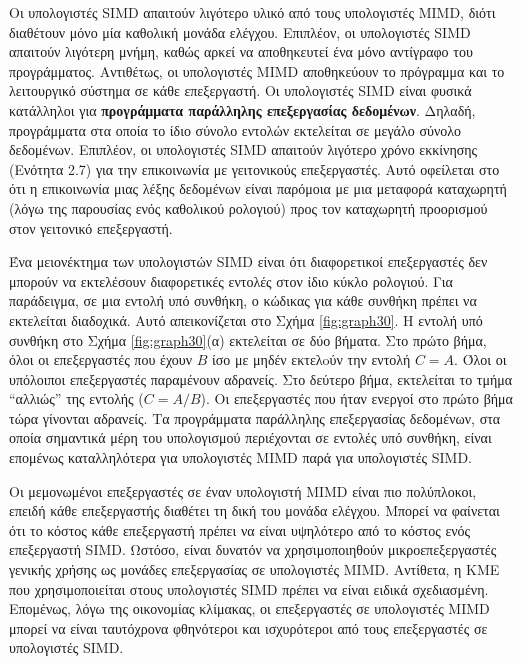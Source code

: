 \documentclass[12pt,a4paper]{article} %
\begin{document}
Οι υπολογιστές SIMD απαιτούν λιγότερο υλικό από τους υπολογιστές MIMD, διότι
διαθέτουν μόνο μία καθολική μονάδα ελέγχου. Επιπλέον, οι υπολογιστές SIMD απαιτούν
λιγότερη μνήμη, καθώς αρκεί να αποθηκευτεί ένα μόνο αντίγραφο του προγράμματος.
Αντιθέτως, οι υπολογιστές MIMD αποθηκεύουν το πρόγραμμα και το λειτουργικό σύστημα
σε κάθε επεξεργαστή. Οι υπολογιστές SIMD είναι φυσικά κατάλληλοι για
\textbf{προγράμματα παράλληλης επεξεργασίας δεδομένων}. Δηλαδή, προγράμματα
στα οποία το ίδιο σύνολο εντολών εκτελείται σε μεγάλο σύνολο δεδομένων. Επιπλέον,
οι υπολογιστές SIMD απαιτούν λιγότερο χρόνο εκκίνησης (Ενότητα 2.7) για την
επικοινωνία με γειτονικούς επεξεργαστές. Αυτό οφείλεται στο ότι η επικοινωνία μιας λέξης 
δεδομένων είναι παρόμοια με μια μεταφορά καταχωρητή (λόγω της παρουσίας 
ενός καθολικού ρολογιού) προς τον καταχωρητή προορισμού στον γειτονικό 
επεξεργαστή.

\begin{sloppypar}
Ένα μειονέκτημα των υπολογιστών SIMD είναι ότι διαφορετικοί επεξεργαστές 
δεν μπορούν να εκτελέσουν διαφορετικές εντολές στον ίδιο κύκλο ρολογιού. 
Για παράδειγμα, σε μια εντολή υπό συνθήκη, ο κώδικας για κάθε συνθήκη 
πρέπει να εκτελείται διαδοχικά. Αυτό απεικονίζεται στο Σχήμα \ref{fig:graph30}. Η 
εντολή υπό συνθήκη στο Σχήμα \ref{fig:graph30}(α) εκτελείται σε δύο βήματα. Στο πρώτο 
βήμα, όλοι οι επεξεργαστές που έχουν \( B \) ίσο με μηδέν εκτελoύν την 
εντολή \( C = A \). Όλοι οι υπόλοιποι επεξεργαστές παραμένουν αδρανείς. 
Στο δεύτερο βήμα, εκτελείται το τμήμα ``αλλιώς'' της εντολής (\( C = A/B \)). 
Οι επεξεργαστές που ήταν ενεργοί στο πρώτο βήμα τώρα γίνονται αδρανείς. 
Τα προγράμματα παράλληλης επεξεργασίας δεδομένων, στα οποία σημαντικά 
μέρη του υπολογισμού περιέχονται σε εντολές υπό συνθήκη, είναι επομένως 
καταλληλότερα για υπολογιστές MIMD παρά για υπολογιστές SIMD. 
\end{sloppypar}

Οι μεμονωμένοι επεξεργαστές σε έναν υπολογιστή MIMD είναι πιο πολύπλοκοι, 
επειδή κάθε επεξεργαστής διαθέτει τη δική του μονάδα ελέγχου. Μπορεί να 
φαίνεται ότι το κόστος κάθε επεξεργαστή πρέπει να είναι υψηλότερο από 
το κόστος ενός επεξεργαστή SIMD. Ωστόσο, είναι δυνατόν να χρησιμοποιηθούν 
μικροεπεξεργαστές γενικής χρήσης ως μονάδες επεξεργασίας σε υπολογιστές 
MIMD. Αντίθετα, η ΚΜΕ που χρησιμοποιείται στους υπολογιστές SIMD πρέπει 
να είναι ειδικά σχεδιασμένη. Επομένως, λόγω της οικονομίας κλίμακας, οι 
επεξεργαστές σε υπολογιστές MIMD μπορεί να είναι ταυτόχρονα φθηνότεροι 
και ισχυρότεροι από τους επεξεργαστές σε υπολογιστές SIMD.
\end{document}
